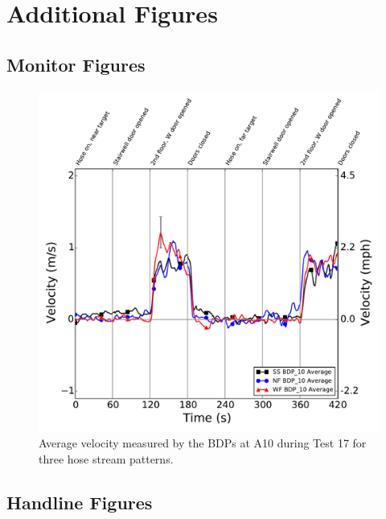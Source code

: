 \documentclass[12pt,oneside]{book}
\begin{document}
\section{Additional Figures}
\label{sec:additional_figs}

\subsection{Monitor Figures}
\label{sec:monitor_figs}

\begin{figure}[!ht]
	\includegraphics[width=6in]{../Figures/Plots/Test_17_West_063014_BDP_A10_stream_avgs}
	\caption{Average velocity measured by the BDPs at A10 during Test 17 for three hose stream patterns.}
	\label{fig:Test_17_BDP_A10_Avg_All}
	\end{figure}
\FloatBarrier

\subsection{Handline Figures}
\label{sec:handline_figs}
\end{document}

